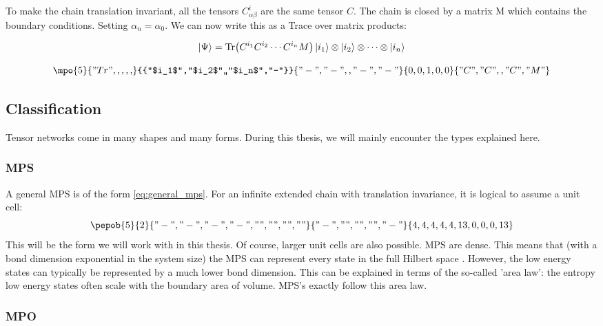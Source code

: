 To make the chain translation invariant, all the tensors $C^i_{\alpha \beta }$ are the same tensor $C$. The chain is closed by a matrix M which contains the boundary conditions. Setting $\alpha_n = \alpha_0$. We can now write this as a Trace over matrix products:

\begin{equation}
    \ket{\Psi} = \Tr( C^{i_1} C^{i_2} \cdots C^{i_n} M  ) \ket{i_1} \otimes \ket{i_2} \otimes \cdots \otimes \ket{i_n}
\end{equation}

\begin{equation}\label{eq:general_mps}
    \mpo{5}{{"Tr",,,,,}}{{"$i_1$","$i_2$",,"$i_n$","-"}}{{"-","-",,"-","-"}}{{0,0,1,0,0}}{{"C", "C",,"C","M" }}
\end{equation}

\subsection{Classification}

Tensor networks come in many shapes and many forms. During this thesis, we will mainly encounter the types explained here.

\subsubsection{MPS}

A general MPS is of the form \cref{eq:general_mps}. For an infinite extended chain with translation invariance, it is logical to assume a unit cell:
\begin{equation}\label{mps:uni}
    \pepob{5}{2}{{
                "-","-", "-","-",
                "","","",""}}{{
                "-",
                "",
                "",
                "",
                "-"}}{{
                4,4,4,4,4,
                13,0,0,0,13}}
\end{equation}
This will be the form we will work with in this thesis. Of course, larger unit cells are also possible. MPS are dense. This means that (with a bond dimension exponential in the system size) the MPS can represent every state in the full Hilbert space \cite{Orus2014}. However, the low energy states can typically be represented by a much lower bond dimension. This can be explained in terms of the so-called 'area law': the entropy low energy states often scale with the boundary area of volume. MPS's exactly follow this area law.

\subsubsection{MPO} \label{mpo_hamil}

